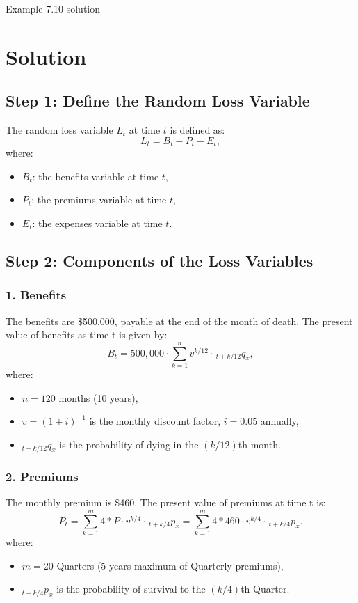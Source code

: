 	\begin{solve}{}{Example 7.10 solution}
		\section*{Solution}
		
		\subsection*{Step 1: Define the Random Loss Variable}
		The random loss variable $L_t$ at time $t$ is defined as:
		\[
		L_t = B_t - P_t - E_t,
		\]
		where:
		\begin{itemize}
			\item $B_t$: the benefits variable at time $t$,
			\item $P_t$: the premiums variable  at time $t$,
			\item $E_t$: the expenses variable at time $t$.
		\end{itemize}
		
		\subsection*{Step 2: Components of the Loss Variables}
		\subsubsection*{1. Benefits}
		The benefits are \$500,000, payable at the end of the month of death. The present value of benefits as time t is given by:
		\[
		B_t = 500,000 \cdot \sum_{k=1}^{n} v^{k/12} \cdot \,_{t+k/12}q_{x},
		\]
		where:
		\begin{itemize}
			\item $n = 120$ months (10 years),
			\item $v = (1+i)^{-1}$ is the monthly discount factor, $i = 0.05$ annually,
			\item $_{t+k/12}q_{x}$ is the probability of dying in the $(k/12)$th month.
		\end{itemize}
		
		\subsubsection*{2. Premiums}
		The monthly premium is \$460. The present value of premiums at time t is:
		\[
		P_t = \sum_{k=1}^{m} 4 * P \cdot v^{k/4} \cdot \,_{t+k/4}p_{x} = \sum_{k=1}^{m} 4 * 460 \cdot v^{k/4} \cdot \,_{t+k/4}p_{x}.
		\]
		where:
		\begin{itemize}
			\item $m = 20$ Quarters (5 years maximum of Quarterly premiums),
			\item $_{t+k/4}p_{x}$ is the probability of survival to the $(k/4)$th Quarter.
		\end{itemize}
		

\end{solve}
